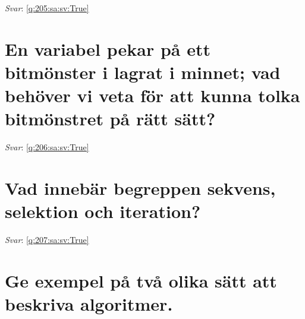 \documentclass[a4paper,11pt,oneside]{book}
\begin{document}
\begin{sloppypar}
\label{q:205:sa:sv:False}

\vspace{2cm}

\noindent\makebox[\textwidth]{\hrulefill}

\vspace{1cm}

\textit{Svar}: \autoref{q:205:sa:sv:True}



\section{En variabel pekar p\r{a} ett bitm\"onster i lagrat i minnet; vad beh\"over vi veta f\"or att kunna tolka bitm\"onstret p\r{a} r\"att s\"att?}

\label{q:206:sa:sv:False}

\vspace{2cm}

\noindent\makebox[\textwidth]{\hrulefill}

\vspace{1cm}

\textit{Svar}: \autoref{q:206:sa:sv:True}



\section{Vad inneb\"ar begreppen sekvens, selektion och iteration?}

\label{q:207:sa:sv:False}

\vspace{2cm}

\noindent\makebox[\textwidth]{\hrulefill}

\vspace{1cm}

\textit{Svar}: \autoref{q:207:sa:sv:True}



\section{Ge exempel p\r{a} tv\r{a} olika s\"att att beskriva algoritmer.}

\label{q:208:sa:sv:False}

\vspace{2cm}

\noindent\makebox[\textwidth]{\hrulefill}

\vspace{1cm}


\end{sloppypar}
\end{document}
